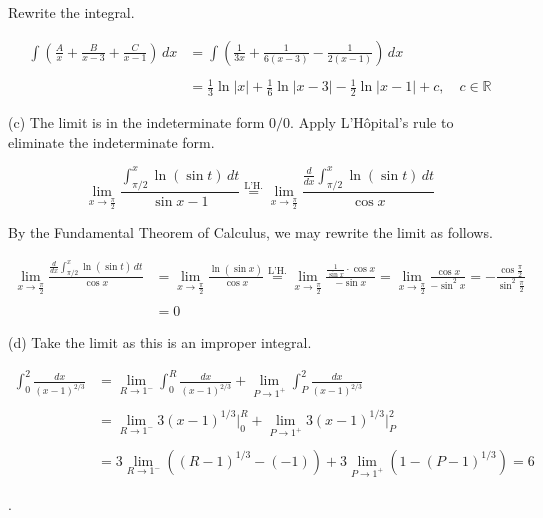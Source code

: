 \documentclass{article}
\begin{document}
\hfill

\noindent Rewrite the integral.

\begin{align*}
\int\left(\frac Ax+\frac B{x-3}+\frac C{x-1}\right)\,dx&=\int\left(\frac1{3x}+\frac1{6(x-3)}-\frac1{2(x-1)}\right)\,dx\\\\&=\boxed{\frac13\ln|x|+\frac16\ln|x-3|-\frac12\ln|x-1|+c,\quad c\in\mathbb{R}}
\end{align*}

\hfill

\noindent (c) The limit is in the indeterminate form $0/0$. Apply L'Hôpital's rule to eliminate the indeterminate form.

\[\lim_{x\to\textstyle\frac\pi2}\frac{\displaystyle\int_{\pi/2}^x\ln(\sin t)\,dt}{\sin x-1}\overset{\text{L'H.}}{=}\lim_{x\to\textstyle\frac\pi2}\frac{\displaystyle\frac d{dx}\int_{\pi/2}^x\ln(\sin t)\,dt}{\cos x}\]

\hfill

\noindent By the Fundamental Theorem of Calculus, we may rewrite the limit as follows.

\begin{align*}\lim_{x\to\textstyle\frac\pi2}\frac{\displaystyle\frac d{dx}\int_{\pi/2}^x\ln(\sin t)\,dt}{\cos x}&=\lim_{x\to\textstyle\frac\pi2}\frac{\ln(\sin x)}{\cos x}\overset{\text{L'H.}}{=}\lim_{x\to\textstyle\frac\pi2}\frac{\frac1{\sin x}\cdot\cos x}{-\sin x}=\lim_{x\to\textstyle\frac\pi2}\frac{\cos x}{-\sin^2x}=-\frac{\cos\frac\pi2}{\sin^2\frac\pi2}\\\\&=\boxed0\end{align*}

\hfill

\noindent (d) Take the limit as this is an improper integral.

\begin{align*}\int_0^2\frac{dx}{(x-1)^{2/3}}&=\lim_{R\to1^-}\int_0^R\frac{dx}{(x-1)^{2/3}}+\lim_{P\to1^+}\int_P^2\frac{dx}{(x-1)^{2/3}}\\\\&=\lim_{R\to1^-}3(x-1)^{1/3}\Bigg|_0^R+\lim_{P\to1^+}3(x-1)^{1/3}\Bigg|_P^2\\\\&=3\lim_{R\to1^-}\left((R-1)^{1/3}-(-1)\right)+3\lim_{P\to1^+}\left(1-(P-1)^{1/3}\right)=\boxed6\end{align*}

\hfill

.
\end{document}
